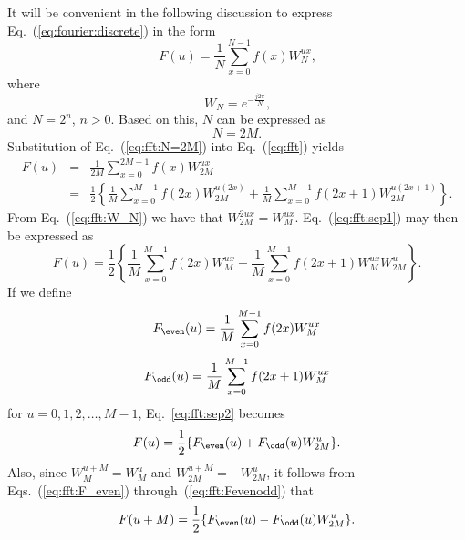 It will be convenient in the following discussion to express
Eq.~(\ref{eq:fourier:discrete}) in the form
\begin{equation}
\label{eq:fft}
  F(u)=\frac{1}{N}\sum_{x=0}^{N-1}f(x)W_{N}^{ux}\mbox{,}
\end{equation}
where
\begin{equation}
\label{eq:fft:W_N}
  W_{N}=e^{-\frac{j2\pi}{N}}\mbox{,}
\end{equation}
and $N=2^{n}$, $n>0$.  Based on this, $N$ can be expressed as
\begin{equation}
\label{eq:fft:N=2M}
  N=2M\mbox{.}
\end{equation}
Substitution of Eq.~(\ref{eq:fft:N=2M}) into Eq.~(\ref{eq:fft})
yields 
\begin{eqnarray}
\label{eq:fft:sep1}
  F(u) & = & \frac{1}{2M}\sum_{x=0}^{2M-1}f(x)W_{2M}^{ux}\nonumber\\
       & = & \frac{1}{2}\left\{\frac{1}{M}\sum_{x=0}^{M-1}
             f(2x)W_{2M}^{u(2x)}+
             \frac{1}{M}\sum_{x=0}^{M-1}
             f(2x+1)W_{2M}^{u(2x+1)}\right\}\mbox{.}
\end{eqnarray}
From Eq.~(\ref{eq:fft:W_N}) we have that $W_{2M}^{2ux}=W_{M}^{ux}$.
Eq.~(\ref{eq:fft:sep1}) may then be expressed as
\begin{equation}
\label{eq:fft:sep2}
  F(u)=\frac{1}{2}\left\{\frac{1}{M}\sum_{x=0}^{M-1}f(2x)W_{M}^{ux}+
  \frac{1}{M}\sum_{x=0}^{M-1}f(2x+1)W_{M}^{ux}W_{2M}^{u}\right\}\mbox{.}
\end{equation}
If we define
\begin{equation}
\label{eq:fft:F_even}
  F_{\even}(u)=\frac{1}{M}\sum_{x=0}^{M-1}f(2x)W_{M}^{ux}
\end{equation}
\begin{equation}
\label{eq:fft:F_odd}
  F_{\odd}(u)=\frac{1}{M}\sum_{x=0}^{M-1}f(2x+1)W_{M}^{ux}
\end{equation}
for $u=0,1,2,\ldots,M-1$, Eq.~\ref{eq:fft:sep2} becomes
\begin{equation}
\label{eq:fft:Fevenodd}
  F(u)=\frac{1}{2}\{F_{\even}(u)+F_{\odd}(u)W_{2M}^{u}\}\mbox{.}
\end{equation}
Also, since $W_{M}^{u+M}=W_{M}^{u}$ and $W_{2M}^{u+M}=-W_{2M}^{u}$, it
follows from Eqs.~(\ref{eq:fft:F_even})
through~(\ref{eq:fft:Fevenodd}) that
\begin{equation}
\label{eq:fft:doubling}
  F(u+M)=\frac{1}{2}\{F_{\even}(u)-F_{\odd}(u)W_{2M}^{u}\}\mbox{.}
\end{equation}

